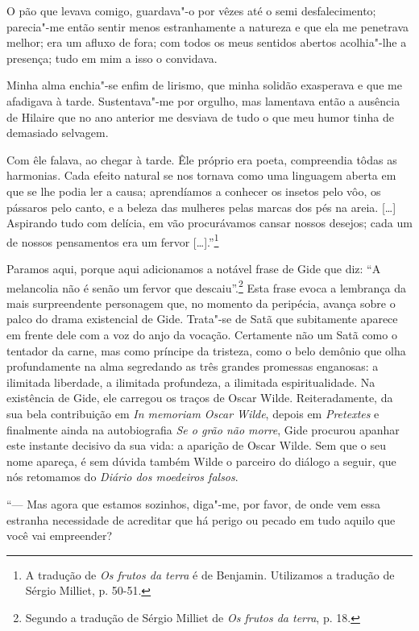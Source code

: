 O pão que levava comigo, guardava"-o por vêzes até o semi desfalecimento;
parecia"-me então sentir menos estranhamente a natureza e que ela me
penetrava melhor; era um afluxo de fora; com todos os meus sentidos
abertos acolhia"-lhe a presença; tudo em mim a isso o convidava.

Minha alma enchia"-se enfim de lirismo, que minha solidão exasperava e
que me afadigava à tarde. Sustentava"-me por orgulho, mas lamentava então
a ausência de Hilaire que no ano anterior me desviava de tudo o que meu
humor tinha de demasiado selvagem.

Com êle falava, ao chegar à tarde. Êle próprio era poeta, compreendia
tôdas as harmonias. Cada efeito natural se nos tornava como uma
linguagem aberta em que se lhe podia ler a causa; aprendíamos a conhecer
os insetos pelo vôo, os pássaros pelo canto, e a beleza das mulheres
pelas marcas dos pés na areia. {[}\ldots{}{]} Aspirando tudo com delícia, em
vão procurávamos cansar nossos desejos; cada um de nossos pensamentos
era um fervor {[}\ldots{}{]}.''\footnote{A tradução de \emph{Os frutos da
  terra} é de Benjamin. Utilizamos a tradução de Sérgio Milliet,
  p. 50-51. \versal{[N. T.]}}

Paramos aqui, porque aqui adicionamos a notável frase de Gide que diz:
``A melancolia não é senão um fervor que descaiu''.\footnote{Segundo a tradução de Sérgio Milliet de \emph{Os frutos da terra},
  p. 18. \versal{[N. T.]}} Esta frase evoca a lembrança da mais surpreendente personagem
que, no momento da peripécia, avança sobre o palco do drama existencial de
Gide. Trata"-se de Satã que subitamente aparece em frente dele com a voz do anjo da
vocação. Certamente não um Satã como o tentador da carne, mas
como príncipe da tristeza, como o belo demônio que olha profundamente na
alma segredando as três grandes promessas enganosas: a ilimitada liberdade,
a ilimitada profundeza, a ilimitada espiritualidade.
Na existência de Gide, ele carregou os traços de Oscar Wilde. Reiteradamente,
da sua bela contribuição em \emph{In memoriam Oscar Wilde}, depois em
\emph{Pretextes} e finalmente ainda na autobiografia \emph{Se o grão não
morre}, Gide procurou apanhar este instante decisivo da sua vida: a
aparição de Oscar Wilde. Sem que o seu nome apareça, é sem dúvida também
Wilde o parceiro do diálogo a seguir, que nós retomamos do \emph{Diário
dos moedeiros falsos}.

``--- Mas agora que estamos sozinhos, diga"-me, por favor, de onde vem essa
estranha necessidade de acreditar que há perigo ou pecado em tudo aquilo
que você vai empreender?


